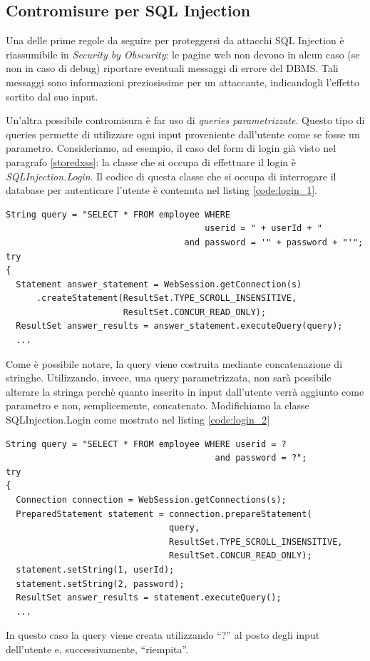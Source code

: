 \documentclass[a4paper,openright,italian]{article}
\begin{document}
\subsection{Contromisure per SQL Injection}
Una delle prime regole da seguire per proteggersi da attacchi SQL Injection \`e riassumibile in \emph{Security by Obscurity}: le pagine web non devono in alcun caso (se non in caso di debug) riportare eventuali messaggi di errore del DBMS. Tali messaggi sono informazioni preziosissime per un attaccante, indicandogli l'effetto sortito dal suo input.

Un'altra possibile contromisura \`e far uso di {\it queries parametrizzate}. Questo tipo di queries permette di utilizzare ogni input proveniente dall'utente come se fosse un parametro. Consideriamo, ad esempio, il caso del form di login gi\`a visto nel paragrafo \ref{storedxss}: la classe che si occupa di effettuare il login \`e {\it SQLInjection.Login}. Il codice di questa classe che si occupa di interrogare il database per autenticare l'utente \`e contenuta nel listing \ref{code:login_1}.
\begin{lstlisting}[caption={Frammento della classe SQLInjection.Login}, label={code:login_1},frame=trBL]
String query = "SELECT * FROM employee WHERE 
                                       userid = " + userId + " 
                                   and password = '" + password + "'";
try
{
  Statement answer_statement = WebSession.getConnection(s)
      .createStatement(ResultSet.TYPE_SCROLL_INSENSITIVE, 
                       ResultSet.CONCUR_READ_ONLY);
  ResultSet answer_results = answer_statement.executeQuery(query);
  ...
\end{lstlisting}
Come \`e possibile notare, la query viene costruita mediante concatenazione di stringhe. Utilizzando, invece, una query parametrizzata, non sar\`a possibile alterare la stringa perch\`e quanto inserito in input dall'utente verr\`a aggiunto come parametro e non, semplicemente, concatenato. Modifichiamo la classe SQLInjection.Login come mostrato nel listing \ref{code:login_2}
\begin{lstlisting}[caption={Classe SQLInjection.Login modificata}, label={code:login_2},frame=trBL]
String query = "SELECT * FROM employee WHERE userid = ? 
                                         and password = ?";
try
{
  Connection connection = WebSession.getConnections(s);
  PreparedStatement statement = connection.prepareStatement(
                                query,
                                ResultSet.TYPE_SCROLL_INSENSITIVE,
                                ResultSet.CONCUR_READ_ONLY);
  statement.setString(1, userId);
  statement.setString(2, password);
  ResultSet answer_results = statement.executeQuery();
  ...
\end{lstlisting}
In questo caso la query viene creata utilizzando ``?'' al posto degli input dell'utente e, successivamente, ``riempita''. 
\end{document}
